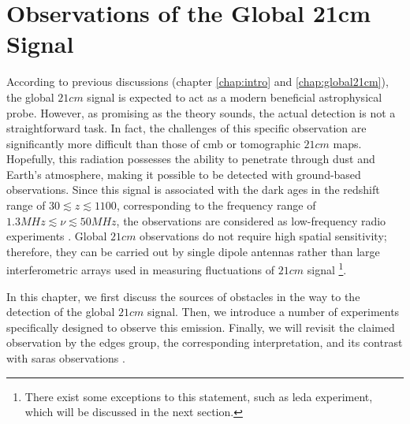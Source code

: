 \documentclass[12pt, TexShade, letterpaper]{report}
\begin{document}
\chapter{Observations of the Global 21cm Signal}
\label{chap:observations}
According to previous discussions (chapter \ref{chap:intro} and \ref{chap:global21cm}), the global $21cm$ signal is expected to act as a modern beneficial astrophysical probe. However, as promising as the theory sounds, the actual detection is not a straightforward task. In fact, the challenges of this specific observation are significantly more difficult than those of \gls{cmb} or tomographic $21cm$ maps. 
Hopefully, this radiation possesses the ability to penetrate through dust and Earth's atmosphere, making it possible to be detected with ground-based observations. Since this signal is associated with the dark ages in the redshift range of $30 \lesssim z \lesssim 1100$, corresponding to the frequency range of $1.3 MHz\lesssim \nu \lesssim 50 MHz$, the observations are considered as low-frequency radio experiments \cite{thesis_pamela, thesis_moso}.
Global $21cm$ observations do not require high spatial sensitivity; therefore, they can be carried out by single dipole antennas rather than large interferometric arrays used in measuring fluctuations of $21cm$ signal \footnote{There exist some exceptions to this statement, such as \gls{leda} experiment, which will be discussed in the next section.}\cite{thesis_shedding}.\par
In this chapter, we first discuss the sources of obstacles in the way to the detection of the global $21cm$ signal. Then, we introduce a number of experiments specifically designed to observe this emission. Finally, we will revisit the claimed observation by the \gls{edges} group, the corresponding interpretation, and its contrast with \gls{saras} observations \cite{saras_curse_edges}.
\end{document}
